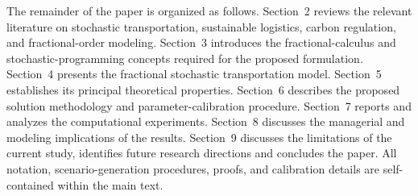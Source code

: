 The remainder of the paper is organized as follows. Section~2 reviews the relevant literature on stochastic transportation, sustainable logistics, carbon regulation, and fractional-order modeling. Section~3 introduces the fractional-calculus and stochastic-programming concepts required for the proposed formulation. Section~4 presents the fractional stochastic transportation model. Section~5 establishes its principal theoretical properties. Section~6 describes the proposed solution methodology and parameter-calibration procedure. Section~7 reports and analyzes the computational experiments. Section~8 discusses the managerial and modeling implications of the results. Section~9 discusses the limitations of the current study, identifies future research directions and concludes the paper. All notation, scenario-generation procedures, proofs, and calibration details are self-contained within the main text.
